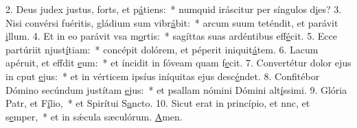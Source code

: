 2. Deus judex justus, forts, et p\uline{á}tiens:~* numquid iráscitur per síngulos d\uline{i}es?
3. Nisi convérsi fuéritis, gládium sum vibr\uline{á}bit:~* arcum suum teténdit, et parávit \uline{i}llum.
4. Et in eo parávit vsa m\uline{o}rtis:~* sagíttas suas ardéntibus eff\uline{é}cit.
5. Ecce partúriit njust\uline{í}tiam:~* concépit dolórem, et péperit iniquit\uline{á}tem.
6. Lacum apéruit, et effdit \uline{e}um:~* et íncidit in fóveam quam f\uline{e}cit.
7. Convertétur dolor ejus in cput \uline{e}jus:~* et in vérticem ipsíus iníquitas ejus desc\uline{é}ndet.
8. Confitébor Dómino secúndum justítam \uline{e}jus:~* et psallam nómini Dómini alt\uline{í}ssimi.
9. Glória Patr, et F\uline{í}lio,~* et Spirítui S\uline{a}ncto.
10. Sicut erat in princípio, et nnc, et s\uline{e}mper,~* et in sǽcula sæculórum. \uline{A}men.
